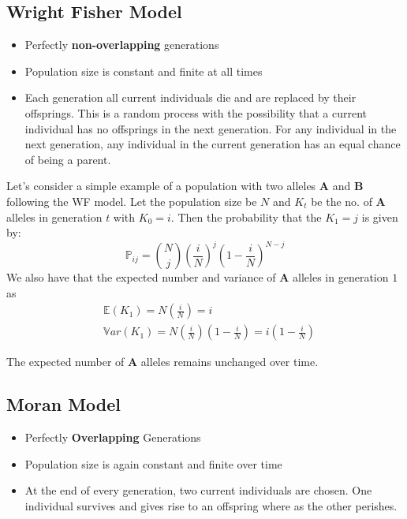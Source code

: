 \documentclass[
]{book}
\providecommand{\tightlist}{%
  \setlength{\itemsep}{0pt}\setlength{\parskip}{0pt}}
\theoremstyle{definition}
\theoremstyle{definition}
\theoremstyle{definition}
\theoremstyle{definition}
\theoremstyle{remark}
\begin{document}
\hypertarget{wright-fisher-model}{%
\subsection*{Wright Fisher Model}\label{wright-fisher-model}}

\begin{itemize}
\tightlist
\item
  Perfectly \textbf{non-overlapping} generations
\item
  Population size is constant and finite at all times
\item
  Each generation all current individuals die and are replaced by their offsprings. This is a random process with the possibility that a current individual has no offsprings in the next generation. For any individual in the next generation, any individual in the current generation has an equal chance of being a parent.
\end{itemize}

Let's consider a simple example of a population with two alleles \textbf{A} and \textbf{B} following the WF model. Let the population size be \(N\) and \(K_t\) be the no. of \textbf{A} alleles in generation \(t\) with \(K_0 = i\). Then the probability that the \(K_1 = j\) is given by: \[\mathbb{P}_{ij} = {N \choose j}\left(\frac{i}{N}\right)^j\left(1-\frac{i}{N}\right)^{N-j}\] We also have that the expected number and variance of \textbf{A} alleles in generation \(1\) as \[\begin{align*} & \mathbb{E}(K_1) = N\left(\frac{i}{N}\right) = i \\ & \mathbb{V}ar(K_1) = N \left(\frac{i}{N}\right) \left(1 - \frac{i}{N}\right) = i\left(1-\frac{i}{N}\right)  \end{align*}\]

The expected number of \textbf{A} alleles remains unchanged over time.

\hypertarget{moran-model}{%
\subsection*{Moran Model}\label{moran-model}}

\begin{itemize}
\tightlist
\item
  Perfectly \textbf{Overlapping} Generations
\item
  Population size is again constant and finite over time
\item
  At the end of every generation, two current individuals are chosen. One individual survives and gives rise to an offspring where as the other perishes.
\end{itemize}
\end{document}
